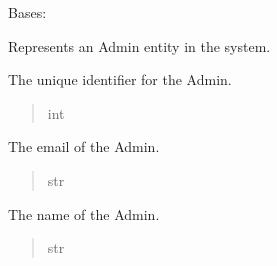 \documentclass[letterpaper,10pt,english]{sphinxmanual}
\begin{document}
\begin{fulllineitems}
\label{\detokenize{app.mysql:app.mysql.admin.Admin}}
\pysigstartsignatures
\pysiglinewithargsret
{}
{}
{}
\pysigstopsignatures
\sphinxAtStartPar
Bases: 

\sphinxAtStartPar
Represents an Admin entity in the system.

\begin{fulllineitems}
\label{\detokenize{app.mysql:app.mysql.admin.Admin.idAdmin}}
\pysigstartsignatures
\pysigline
{}
\pysigstopsignatures
\sphinxAtStartPar
The unique identifier for the Admin.
\begin{quote}\begin{description}
\sphinxAtStartPar
int

\end{description}\end{quote}

\end{fulllineitems}


\begin{fulllineitems}
\label{\detokenize{app.mysql:app.mysql.admin.Admin.email}}
\pysigstartsignatures
\pysigline
{}
\pysigstopsignatures
\sphinxAtStartPar
The email of the Admin.
\begin{quote}\begin{description}
\sphinxAtStartPar
str

\end{description}\end{quote}

\end{fulllineitems}


\begin{fulllineitems}
\label{\detokenize{app.mysql:app.mysql.admin.Admin.name}}
\pysigstartsignatures
\pysigline
{}
\pysigstopsignatures
\sphinxAtStartPar
The name of the Admin.
\begin{quote}\begin{description}
\sphinxAtStartPar
str


\end{description}
\end{quote}
\end{fulllineitems}
\end{fulllineitems}
\end{document}

